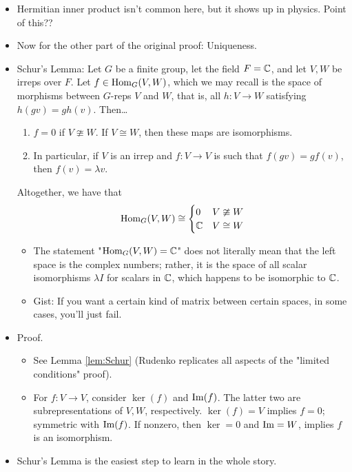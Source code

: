 \documentclass[../notes.tex]{subfiles}
\begin{document}
\begin{itemize}
\begin{itemize}
    \end{itemize}
    \item Hermitian inner product isn't common here, but it shows up in physics. Point of this??
    \item Now for the other part of the original proof: Uniqueness.
    \item Schur's Lemma: Let $G$ be a finite group, let the field $F=\mathbb{C}$, and let $V,W$ be irreps over $F$. Let $f\in\operatorname{Hom}_G(V,W)$, which we may recall is the space of morphisms between $G$-reps $V$ and $W$, that is, all $h:V\to W$ satisfying $h(gv)=gh(v)$. Then\dots
    \begin{enumerate}
        \item $f=0$ if $V\ncong W$. If $V\cong W$, then these maps are isomorphisms.
        \item In particular, if $V$ is an irrep and $f:V\to V$ is such that $f(gv)=gf(v)$, then $f(v)=\lambda v$.
    \end{enumerate}
    Altogether, we have that
    \begin{equation*}
        \operatorname{Hom}_G(V,W) \cong
        \begin{cases}
            0 & V\ncong W\\
            \mathbb{C} & V\cong W
        \end{cases}
    \end{equation*}
    \begin{itemize}
        \item The statement "$\operatorname{Hom}_G(V,W)=\mathbb{C}$" does not literally mean that the left space is the complex numbers; rather, it is the space of all scalar isomorphisms $\lambda I$ for scalars in $\mathbb{C}$, which happens to be isomorphic to $\mathbb{C}$.
        \item Gist: If you want a certain kind of matrix between certain spaces, in some cases, you'll just fail.
    \end{itemize}
    \item Proof.
    \begin{itemize}
        \item See Lemma \ref{lem:Schur} (Rudenko replicates all aspects of the "limited conditions" proof).
        \item For $f:V\to V$, consider $\ker(f)$ and $\operatorname{Im}(f)$. The latter two are subrepresentations of $V,W$, respectively. $\ker(f)=V$ implies $f=0$; symmetric with $\operatorname{Im}(f)$. If nonzero, then $\ker=0$ and $\operatorname{Im}=W$, implies $f$ is an isomorphism.
    \end{itemize}
    \item Schur's Lemma is the easiest step to learn in the whole story.

\end{itemize}
\end{document}
